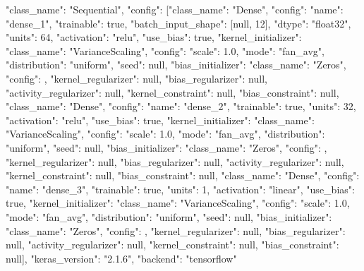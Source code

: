 {"class_name": "Sequential",
	"config": [{"class_name": "Dense", 
				"config": {"name": "dense_1", 
							"trainable": true, 
							"batch_input_shape": [null, 12], 
							"dtype": "float32", 
							"units": 64, 
							"activation": "relu", 
							"use_bias": true, 
							"kernel_initializer": {"class_name": "VarianceScaling", 
													"config": {"scale": 1.0, 
																"mode": "fan_avg", 
																"distribution": "uniform", 
																"seed": null}}, 
							"bias_initializer": {"class_name": "Zeros", 
													"config": {}}, 
							"kernel_regularizer": null, 
							"bias_regularizer": null, 
							"activity_regularizer": null,
							"kernel_constraint": null, 
							"bias_constraint": null}}, 
				{"class_name": "Dense", 
				"config": {"name": "dense_2", 
							"trainable": true, 
							"units": 32, 
							"activation": "relu", 
							"use_bias": true, 
							"kernel_initializer": {"class_name": "VarianceScaling", 
													"config": {"scale": 1.0, 
													"mode": "fan_avg", 
													"distribution": "uniform", 
													"seed": null}}, 
													"bias_initializer": {"class_name": "Zeros", 
																		"config": {}}, 
							"kernel_regularizer": null, 
							"bias_regularizer": null, 
							"activity_regularizer": null, 
							"kernel_constraint": null, 
							"bias_constraint": null}}, 
				{"class_name": "Dense", 
				"config": {"name": "dense_3", 
							"trainable": true, 
							"units": 1, "activation": 
							"linear", "use_bias": true, 
							"kernel_initializer": {"class_name": "VarianceScaling", 
													"config": {"scale": 1.0, 
													"mode": "fan_avg",
													"distribution": "uniform",
													"seed": null}}, 
							"bias_initializer": {"class_name": "Zeros",
												"config": {}},
							"kernel_regularizer": null,
							"bias_regularizer": null,
							"activity_regularizer": null,
							"kernel_constraint": null,
							"bias_constraint": null}}],
	"keras_version": "2.1.6", "backend": "tensorflow"}